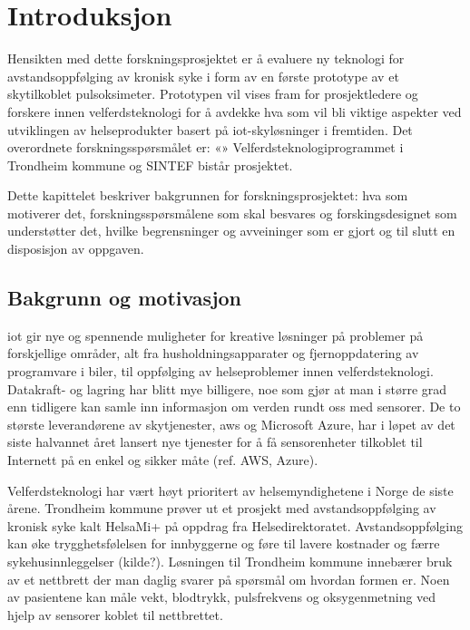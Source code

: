 \chapter{Introduksjon}
\label{ch:introduction}
Hensikten med dette forskningsprosjektet er å evaluere ny teknologi for avstandsoppfølging av kronisk
syke i form av en første prototype av et skytilkoblet pulsoksimeter. Prototypen
vil vises fram for prosjektledere og forskere innen velferdsteknologi for
å avdekke hva som vil bli viktige aspekter ved utviklingen av helseprodukter
basert på \gls{iot}-skyløsninger i fremtiden.
Det overordnete forskningsspørsmålet er: «\fs{}»
Velferdsteknologiprogrammet i Trondheim kommune og SINTEF bistår prosjektet.

Dette kapittelet beskriver bakgrunnen for forskningsprosjektet: hva som motiverer det,
forskningsspørsmålene som skal besvares og forskingsdesignet som understøtter det,
hvilke begrensninger og avveininger som er gjort og til slutt en disposisjon av oppgaven.

\section{Bakgrunn og motivasjon}
\gls{iot} gir nye og spennende muligheter for kreative løsninger på problemer på forskjellige områder, alt fra husholdningsapparater
og fjernoppdatering av programvare i biler, til oppfølging av helseproblemer innen velferdsteknologi. Datakraft- og lagring
har blitt mye billigere, noe som gjør at man i større grad enn tidligere kan samle inn informasjon om verden rundt oss
med sensorer. De to største leverandørene av skytjenester, \gls{aws} og Microsoft Azure,
har i løpet av det siste halvannet året lansert nye tjenester for å få sensorenheter tilkoblet til Internett
på en enkel og sikker måte (ref. AWS, Azure).

Velferdsteknologi har vært høyt prioritert av helsemyndighetene i Norge de siste årene. Trondheim kommune prøver ut
et prosjekt med avstandsoppfølging av kronisk syke kalt HelsaMi+ på oppdrag fra Helsedirektoratet. 
Avstandsoppfølging kan øke trygghetsfølelsen for innbyggerne og føre til lavere kostnader og færre sykehusinnleggelser (kilde?).
Løsningen til Trondheim kommune innebærer bruk av et nettbrett der man daglig svarer på spørsmål om hvordan formen er. Noen av pasientene
kan måle vekt, blodtrykk, pulsfrekvens og oksygenmetning ved hjelp av sensorer koblet til nettbrettet.

